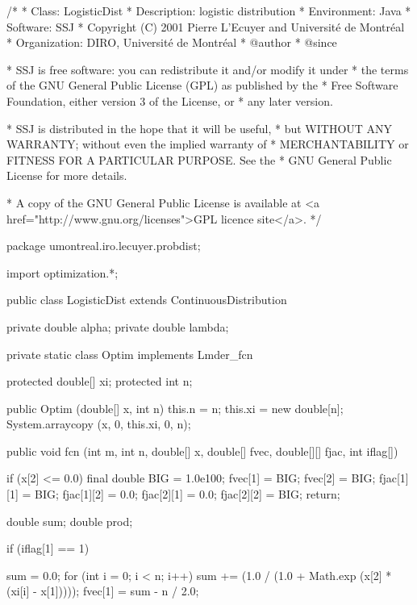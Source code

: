 \begin{code}
\begin{hide}
/*
 * Class:        LogisticDist
 * Description:  logistic distribution
 * Environment:  Java
 * Software:     SSJ 
 * Copyright (C) 2001  Pierre L'Ecuyer and Université de Montréal
 * Organization: DIRO, Université de Montréal
 * @author       
 * @since

 * SSJ is free software: you can redistribute it and/or modify it under
 * the terms of the GNU General Public License (GPL) as published by the
 * Free Software Foundation, either version 3 of the License, or
 * any later version.

 * SSJ is distributed in the hope that it will be useful,
 * but WITHOUT ANY WARRANTY; without even the implied warranty of
 * MERCHANTABILITY or FITNESS FOR A PARTICULAR PURPOSE.  See the
 * GNU General Public License for more details.

 * A copy of the GNU General Public License is available at
   <a href="http://www.gnu.org/licenses">GPL licence site</a>.
 */
\end{hide}
package umontreal.iro.lecuyer.probdist;
\begin{hide}
import optimization.*;
\end{hide}

public class LogisticDist extends ContinuousDistribution\begin{hide} {
   private double alpha;
   private double lambda;

   private static class Optim implements Lmder_fcn
   {
      protected double[] xi;
      protected int n;

      public Optim (double[] x, int n) {
         this.n = n;
         this.xi = new double[n];
         System.arraycopy (x, 0, this.xi, 0, n);
      }

      public void fcn (int m, int n, double[] x, double[] fvec, double[][] fjac, int iflag[])
      {
         if (x[2] <= 0.0) {
             final double BIG = 1.0e100;
             fvec[1] = BIG;
             fvec[2] = BIG;
             fjac[1][1] = BIG;
             fjac[1][2] = 0.0;
             fjac[2][1] = 0.0;
             fjac[2][2] = BIG;
             return;
         }

         double sum;
         double prod;

         if (iflag[1] == 1)
         {
            sum = 0.0;
            for (int i = 0; i < n; i++)
               sum += (1.0 / (1.0 + Math.exp (x[2] * (xi[i] - x[1]))));
            fvec[1] = sum - n / 2.0;

}}}}
\end{hide}
\end{code}
